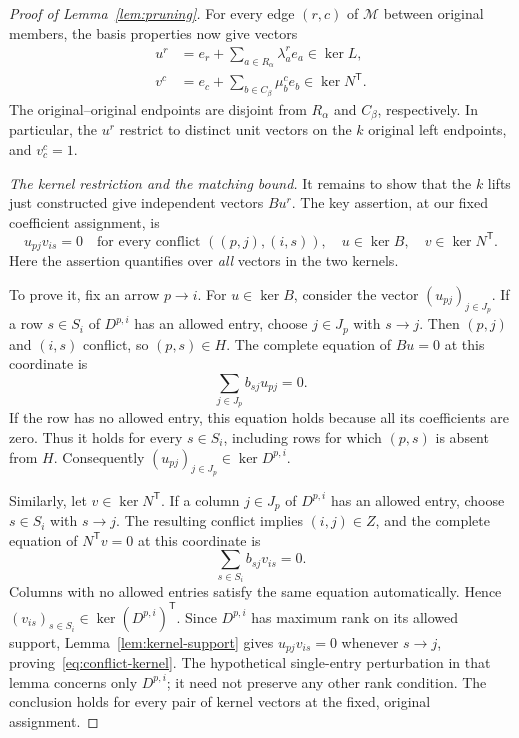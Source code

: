 \begin{proof}[Proof of Lemma~\ref{lem:pruning}]
For every edge $(r,c)$ of $\mathcal M$ between original members, the
basis properties now give vectors
\begin{equation}\label{eq:pruning-lifts}
 \begin{aligned}
 u^r&=e_r+\sum_{a\in R_\alpha}\lambda_a^r e_a
                 \in\ker L,\\
 v^c&=e_c+\sum_{b\in C_\beta}\mu_b^c e_b
                 \in\ker N^{\mathsf T}.
 \end{aligned}
\end{equation}
The original--original endpoints are disjoint from $R_\alpha$ and
$C_\beta$, respectively.  In particular, the $u^r$ restrict to distinct
unit vectors on the $k$ original left endpoints, and $v^c_c=1$.

\medskip\noindent
\emph{The kernel restriction and the matching bound.}
It remains to show that the $k$ lifts just constructed give independent
vectors $Bu^r$. The key assertion, at our fixed coefficient assignment, is
\begin{equation}\label{eq:conflict-kernel}
 u_{pj}v_{is}=0
 \quad\text{for every conflict }((p,j),(i,s)),
 \quad u\in\ker B,\quad v\in\ker N^{\mathsf T}.
\end{equation}
Here the assertion quantifies over \emph{all} vectors in the two kernels.

To prove it, fix an arrow $p\to i$.  For $u\in\ker B$, consider the
vector $(u_{pj})_{j\in J_p}$.  If a row $s\in S_i$ of $D^{p,i}$ has
an allowed entry, choose $j\in J_p$ with $s\to j$.  Then
$(p,j)$ and $(i,s)$ conflict, so $(p,s)\in H$.  The complete equation
of $Bu=0$ at this coordinate is
\begin{equation}\label{eq:pruning-row-equation}
 \sum_{j\in J_p}b_{sj}u_{pj}=0.
\end{equation}
If the row has no allowed entry, this equation holds because all its
coefficients are zero.  Thus it holds for every $s\in S_i$, including
rows for which $(p,s)$ is absent from $H$.  Consequently
$(u_{pj})_{j\in J_p}\in\ker D^{p,i}$.

Similarly, let $v\in\ker N^{\mathsf T}$.  If a column $j\in J_p$
of $D^{p,i}$ has an allowed entry, choose $s\in S_i$ with $s\to j$.
The resulting conflict implies $(i,j)\in Z$, and the complete equation
of $N^{\mathsf T}v=0$ at this coordinate is
\begin{equation}\label{eq:pruning-column-equation}
 \sum_{s\in S_i}b_{sj}v_{is}=0.
\end{equation}
Columns with no allowed entries satisfy the same equation
automatically.  Hence $(v_{is})_{s\in S_i}\in\ker(D^{p,i})^{\mathsf T}$.
Since $D^{p,i}$ has maximum rank on its allowed support,
Lemma~\ref{lem:kernel-support} gives $u_{pj}v_{is}=0$ whenever
$s\to j$, proving~\eqref{eq:conflict-kernel}.
The hypothetical single-entry perturbation in that lemma concerns only
$D^{p,i}$; it need not preserve any other rank condition.  The conclusion
holds for every pair of kernel vectors at the fixed, original assignment.


\end{proof}
